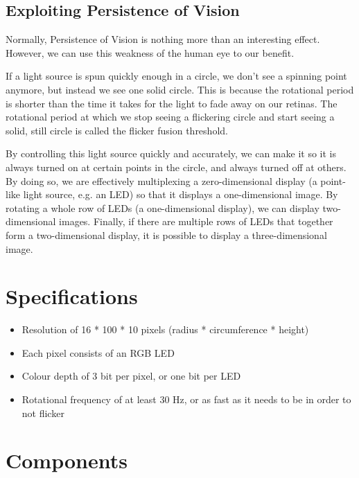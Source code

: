 \documentclass[a4paper, 11pt, titlepage]{report}
\begin{document}
\subsection{Exploiting Persistence of Vision}

Normally, Persistence of Vision is nothing more than an interesting effect. However, we can 
use this weakness of the human eye to our benefit.

If a light source is spun quickly enough in a circle, we don't see a spinning
point anymore, but instead we see one solid circle. This is because the rotational period is
shorter than the time it takes for the light to fade away on our retinas. The rotational period
at which we stop seeing a flickering circle and start seeing a solid, still circle is called
the flicker fusion threshold.

By controlling this light source quickly and accurately, we can make it so it is always turned 
on at certain points in the circle, and always turned off at others. By doing so, we are
effectively multiplexing a zero-dimensional display (a point-like light source, e.g. an LED)
so that it displays a one-dimensional image. By rotating a whole row of LEDs (a one-dimensional
display), we can display two-dimensional images. Finally, if there are multiple rows of LEDs
that together form a two-dimensional display, it is possible to display a three-dimensional
image.


\section{Specifications}

\begin{itemize}

	\item Resolution of 16 * 100 * 10 pixels (radius * circumference * height)
	\item Each pixel consists of an RGB LED
	\item Colour depth of 3 bit per pixel, or one bit per LED
	\item Rotational frequency of at least 30 Hz, or as fast as it needs to be in order to not flicker

\end{itemize}




\section{Components}
\end{document}
